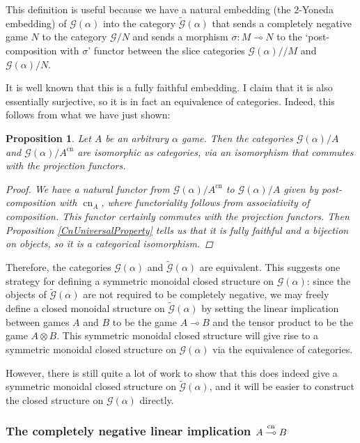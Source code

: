 \documentclass[11pt]{article} %
\theoremstyle{plain} %
\newtheorem{proposition}[theorem]{Proposition}
\theoremstyle{definition} %
\theoremstyle{note}
\theoremstyle{exercisestyle}
\newcommand*\from{\colon}
\newcommand{\tensor}{\otimes}
\renewcommand{\implies}{\multimap}
\newcommand{\G}{\mathcal G}
\DeclareMathOperator{\cn}{cn}
\newcommand{\impliescn}{\protect\overset{\cn}{\implies}}
\begin{document}
This definition is useful because we have a natural embedding (the $2$-Yoneda embedding) of $\G(\alpha)$ into the category $\tilde{\G}(\alpha)$ that sends a completely negative game $N$ to the category $\G/N$ and sends a morphism $\sigma\from M\implies N$ to the `post-composition with $\sigma$' functor between the slice categories $\G(\alpha)//M$ and $\G(\alpha)/N$.  

It is well known that this is a fully faithful embedding.  I claim that it is also essentially surjective, so it is in fact an equivalence of categories.  Indeed, this follows from what we have just shown:

\begin{proposition}
  Let $A$ be an arbitrary $\alpha$ game.  Then the categories $\G(\alpha)/A$ and $\G(\alpha)/A^{\cn}$ are isomorphic as categories, via an isomorphism that commutes with the projection functors.

  \begin{proof}
    We have a natural functor from $\G(\alpha)/A^{\cn}$ to $\G(\alpha)/A$ given by post-composition with $\cn_A$, where functoriality follows from associativity of composition.  This functor certainly commutes with the projection functors.  Then Proposition \ref{CnUniversalProperty} tells us that it is fully faithful and a bijection on objects, so it is a categorical isomorphism.
  \end{proof}
\end{proposition}

Therefore, the categories $\G(\alpha)$ and $\tilde{\G}(\alpha)$ are equivalent.  This suggests one strategy for defining a symmetric monoidal closed structure on $\G(\alpha)$: since the objects of $\tilde{\G}(\alpha)$ are not required to be completely negative, we may freely define a closed monoidal structure on $\tilde{\G}(\alpha)$ by setting the linear implication between games $A$ and $B$ to be the game $A\implies B$ and the tensor product to be the game $A\tensor B$.  This symmetric monoidal closed structure will give rise to a symmetric monoidal closed structure on $\G(\alpha)$ via the equivalence of categories.  

However, there is still quite a lot of work to show that this does indeed give a symmetric monoidal closed structure on $\tilde{\G}(\alpha)$, and it will be easier to construct the closed structure on $\G(\alpha)$ directly.

\subsubsection{The completely negative linear implication $A\impliescn B$}
\label{ImpliesCnSex}
\end{document}
